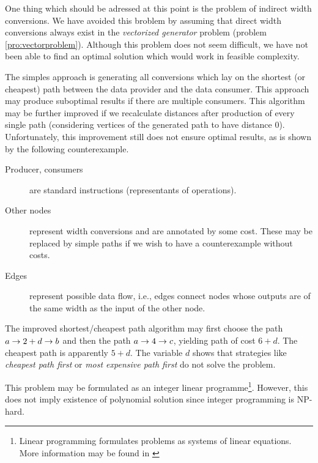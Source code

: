 \label{sec:shortpaths}

One thing which should be adressed at this point is the problem of indirect width conversions. We have avoided this broblem by assuming that direct width conversions always exist in the \emph{vectorized generator} problem (problem \ref{pro:vectorproblem}).  Although this problem does not seem difficult, we have not been able to find an optimal solution which would work in feasible complexity. 

The simples approach is generating all conversions which lay on the shortest (or cheapest) path between the data provider and the data consumer. This approach may produce suboptimal results if there are multiple consumers. This algorithm may be further improved if we recalculate distances after production of every single path (considering vertices of the generated path to have distance 0). Unfortunately, this improvement still does not ensure optimal results, as is shown by the following counterexample.


\begin{description}
  \item[Producer, consumers] are standard instructions (representants of operations).
  \item[Other nodes] represent width conversions and are annotated by some cost. These may be replaced by simple paths if we wish to have a counterexample without costs.
  \item[Edges] represent possible data flow, i.e., edges connect nodes whose outputs are of the same width as the input of the other node.
  \end{description}

The improved shortest/cheapest path algorithm may first choose the path $ a \rightarrow 2 + d \rightarrow b $ and then the path $ a \rightarrow 4 \rightarrow c $, yielding path of cost $6+d$. The cheapest path is apparently $5+d$. The variable $d$ shows that strategies like \emph{cheapest path first} or \emph{most expensive path first} do not solve the problem.

This problem may be formulated as an integer linear programme\footnote{Linear programming formulates problems as systems of linear equations. More information may be found in \cite{ilp}}. However, this does not imply existence of polynomial solution since integer programming is NP-hard. 

